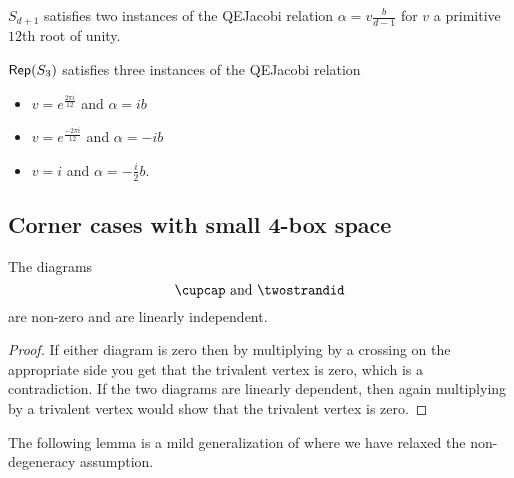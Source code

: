 \documentclass[12pt]{amsart}
\begin{document}
\begin{lemma}
$S_{d+1}$ satisfies two instances of the QEJacobi relation $\alpha = v \frac{b}{d-1}$ for $v$ a primitive $12$th root of unity.
\end{lemma}

\begin{lemma}
$\operatorname{\mathsf{Rep}}(S_3)$ satisfies three instances of the QEJacobi relation
\begin{itemize}
\item $v = e^{\frac{2 \pi i}{12}}$ and $\alpha = i b$
\item $v = e^{\frac{-2 \pi i}{12}}$ and $\alpha = -i b$
\item $v = i$ and $\alpha = -\frac{i}{2} b$.
\end{itemize}
\end{lemma}











\subsection{Corner cases with small 4-box space}

\begin{lemma}
The diagrams
$$\cupcap \text{ and } \twostrandid$$
are non-zero and are linearly independent.
\end{lemma}
\begin{proof}
If either diagram is zero then by multiplying by a crossing on the appropriate side you get that the trivalent vertex is zero, which is a contradiction.  If the two diagrams are linearly dependent, then again multiplying by a trivalent vertex would show that the trivalent vertex is zero.
\end{proof}


The following lemma is a mild generalization of  where we have relaxed the non-degeneracy assumption.
\end{document}
